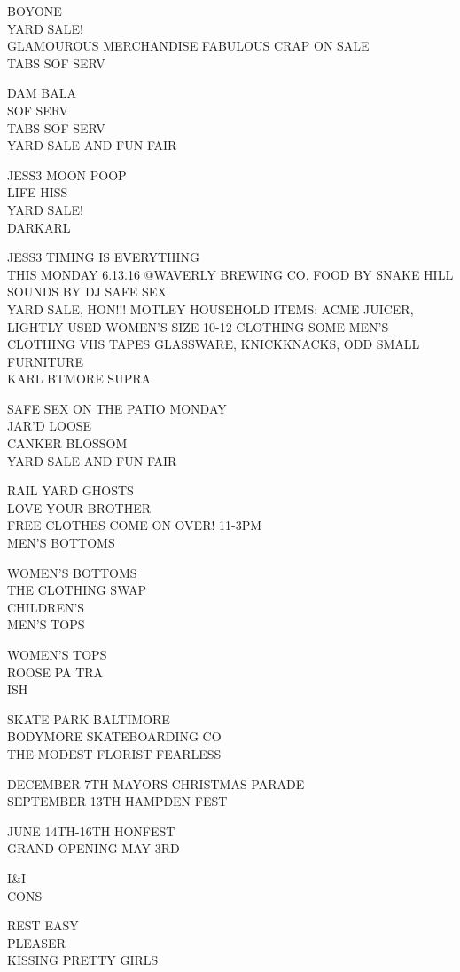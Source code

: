 \documentclass[10pt,letterpaper]{article}
\begin{document}
BOYONE\\
YARD SALE!\\
GLAMOUROUS MERCHANDISE FABULOUS CRAP ON SALE\\
TABS SOF SERV

DAM BALA\\
SOF SERV\\
TABS SOF SERV\\
YARD SALE AND FUN FAIR

JESS3 MOON POOP\\
LIFE HISS\\
YARD SALE!\\
DARKARL

JESS3 TIMING IS EVERYTHING\\
THIS MONDAY 6.13.16 @WAVERLY BREWING CO. FOOD BY SNAKE HILL SOUNDS BY DJ SAFE SEX\\
YARD SALE, HON!!! MOTLEY HOUSEHOLD ITEMS: ACME JUICER, LIGHTLY USED WOMEN'S SIZE 10{-}12 CLOTHING SOME MEN'S CLOTHING VHS TAPES GLASSWARE, KNICKKNACKS, ODD SMALL FURNITURE\\
KARL BTMORE SUPRA

SAFE SEX ON THE PATIO MONDAY\\
JAR'D LOOSE\\
CANKER BLOSSOM\\
YARD SALE AND FUN FAIR

RAIL YARD GHOSTS\\
LOVE YOUR BROTHER\\
FREE CLOTHES COME ON OVER!  11{-}3PM\\
MEN'S BOTTOMS

WOMEN'S BOTTOMS\\
THE CLOTHING SWAP\\
CHILDREN'S\\
MEN'S TOPS

WOMEN'S TOPS\\
ROOSE PA TRA\\
ISH

SKATE PARK BALTIMORE\\
BODYMORE SKATEBOARDING CO\\
THE MODEST FLORIST FEARLESS

DECEMBER 7TH MAYORS CHRISTMAS PARADE\\
SEPTEMBER 13TH HAMPDEN FEST

JUNE 14TH{-}16TH HONFEST\\
GRAND OPENING MAY 3RD

I\&I\\
CONS

REST EASY\\
PLEASER\\
KISSING PRETTY GIRLS
\end{document}
